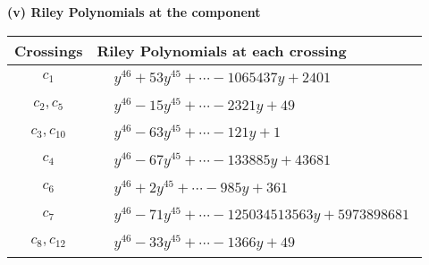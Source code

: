 \documentclass[1p]{elsarticle_modified}
\theoremstyle{definition}
\begin{document}
\newpage\renewcommand{\arraystretch}{1}
\flushleft \textbf{(v) Riley Polynomials at the component}\newline \\
\begin{tabular}{m{50pt}|m{274pt}}
Crossings & \hspace{64pt}Riley Polynomials at each crossing \\
\hline $$\begin{aligned}c_{1}\end{aligned}$$&$\begin{aligned}
&y^{46}+53 y^{45}+\cdots-1065437 y+2401
\end{aligned}$\\
\hline $$\begin{aligned}c_{2},c_{5}\end{aligned}$$&$\begin{aligned}
&y^{46}-15 y^{45}+\cdots-2321 y+49
\end{aligned}$\\
\hline $$\begin{aligned}c_{3},c_{10}\end{aligned}$$&$\begin{aligned}
&y^{46}-63 y^{45}+\cdots-121 y+1
\end{aligned}$\\
\hline $$\begin{aligned}c_{4}\end{aligned}$$&$\begin{aligned}
&y^{46}-67 y^{45}+\cdots-133885 y+43681
\end{aligned}$\\
\hline $$\begin{aligned}c_{6}\end{aligned}$$&$\begin{aligned}
&y^{46}+2 y^{45}+\cdots-985 y+361
\end{aligned}$\\
\hline $$\begin{aligned}c_{7}\end{aligned}$$&$\begin{aligned}
&y^{46}-71 y^{45}+\cdots-125034513563 y+5973898681
\end{aligned}$\\
\hline $$\begin{aligned}c_{8},c_{12}\end{aligned}$$&$\begin{aligned}
&y^{46}-33 y^{45}+\cdots-1366 y+49
\end{aligned}$\\

\end{tabular}
\end{document}
